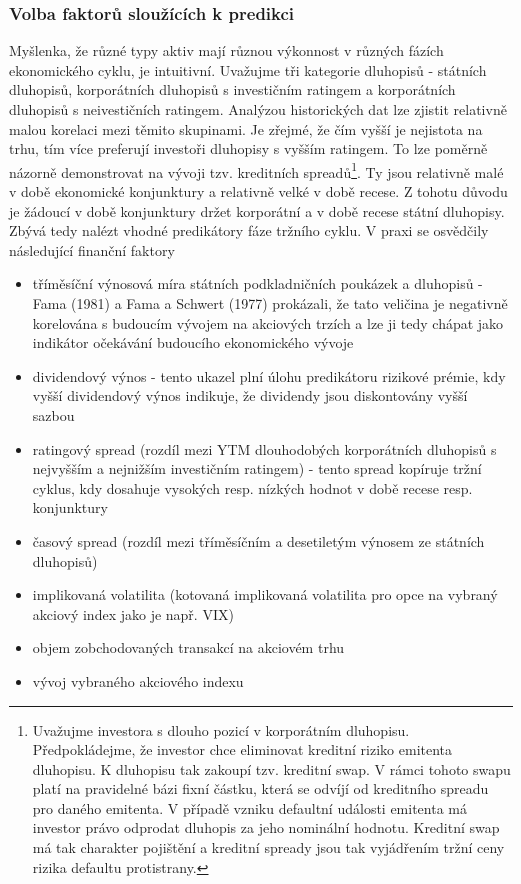 \documentclass[a4paper]{book}
\begin{document}
\subsubsection{Volba faktorů sloužících k predikci}

Myšlenka, že různé typy aktiv mají různou výkonnost v různých fázích ekonomického cyklu, je intuitivní. Uvažujme tři kategorie dluhopisů - státních dluhopisů, korporátních dluhopisů s investičním ratingem a korporátních dluhopisů s neivestičních ratingem. Analýzou historických dat lze zjistit relativně malou korelaci mezi těmito skupinami. Je zřejmé, že čím vyšší je nejistota na trhu, tím více preferují investoři dluhopisy s vyšším ratingem. To lze poměrně názorně demonstrovat na vývoji tzv. kreditních spreadů\footnote{Uvažujme investora s dlouho pozicí v korporátním dluhopisu. Předpokládejme, že investor chce eliminovat kreditní riziko emitenta dluhopisu. K dluhopisu tak zakoupí tzv. kreditní swap. V rámci tohoto swapu platí na pravidelné bázi fixní částku, která se odvíjí od kreditního spreadu pro daného emitenta. V případě vzniku defaultní události emitenta má investor právo odprodat dluhopis za jeho nominální hodnotu. Kreditní swap má tak charakter pojištění a kreditní spready jsou tak vyjádřením tržní ceny rizika defaultu protistrany.}. Ty jsou relativně malé v době ekonomické konjunktury a relativně velké v době recese. Z tohotu důvodu je žádoucí v době konjunktury držet korporátní a v době recese státní dluhopisy. Zbývá tedy nalézt vhodné predikátory fáze tržního cyklu. V praxi se osvědčily následující finanční faktory
\begin{itemize}
\item tříměsíční výnosová míra státních podkladničních poukázek a dluhopisů - Fama (1981) a Fama a Schwert (1977) prokázali, že tato veličina je negativně korelována s budoucím vývojem na akciových trzích a lze ji tedy chápat jako indikátor očekávání budoucího ekonomického vývoje
\item dividendový výnos - tento ukazel plní úlohu predikátoru rizikové prémie, kdy vyšší dividendový výnos indikuje, že dividendy jsou diskontovány vyšší sazbou
\item ratingový spread (rozdíl mezi YTM dlouhodobých korporátních dluhopisů s nejvyšším a nejnižším investičním ratingem) - tento spread kopíruje tržní cyklus, kdy dosahuje vysokých resp. nízkých hodnot v době recese resp. konjunktury
\item časový spread (rozdíl mezi tříměsíčním a desetiletým výnosem ze státních dluhopisů)
\item implikovaná volatilita (kotovaná implikovaná volatilita pro opce na vybraný akciový index jako je např. VIX)
\item objem zobchodovaných transakcí na akciovém trhu
\item vývoj vybraného akciového indexu  
\end{itemize}
\end{document}
